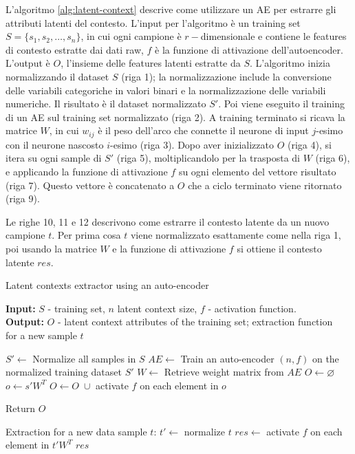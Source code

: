 \documentclass[12pt,italian]{report}
\begin{document}
L'algoritmo \autoref{alg:latent-context} descrive come utilizzare un AE per estrarre gli attributi latenti del contesto. L'input per l'algoritmo è un training set $S = \{s_1, s_2, \dots, s_n\}$, in cui ogni campione è $r-$dimensionale e contiene le features di contesto estratte dai dati raw, $f$ è la funzione di attivazione dell'autoencoder. L'output è $O$, l'insieme delle features latenti estratte da $S$. L'algoritmo inizia normalizzando il dataset $S$ (riga 1); la normalizzazione include la conversione delle variabili categoriche in valori binari e la normalizzazione delle variabili numeriche. Il risultato è il dataset normalizzato $S'$. Poi viene eseguito il training di un AE sul training set normalizzato (riga 2). A training terminato si ricava la matrice $W$, in cui $w_{ij}$ è il peso dell'arco che connette il neurone di input $j$-esimo con il neurone nascosto $i$-esimo (riga 3). Dopo aver inizializzato $O$ (riga 4), si itera su ogni sample di $S'$ (riga 5), moltiplicandolo per la trasposta di $W$ (riga 6), e applicando la funzione di attivazione $f$ su ogni elemento del vettore risultato (riga 7). Questo vettore è concatenato a $O$ che a ciclo terminato viene ritornato (riga 9).

Le righe 10, 11 e 12 descrivono come estrarre il contesto latente da un nuovo campione $t$. Per prima cosa $t$ viene normalizzato esattamente come nella riga 1, poi usando la matrice $W$ e la funzione di attivazione $f$ si ottiene il contesto latente $res$.

\begin{algorithm}
\caption{Latent contexts extractor using an auto-encoder}
\label{alg:latent-context}
 \hspace*{\algorithmicindent} \textbf{Input:} $S$ - training set, $n$ latent context size, $f$ - activation function.\\
 \hspace*{\algorithmicindent} \textbf{Output:} $O$ - latent context attributes of the training set; extraction function\\ 
 \hspace*{\algorithmicindent} for a new sample $t$
\begin{algorithmic}[1]
\STATE $S' \leftarrow$ Normalize all samples in $S$
\STATE $AE \leftarrow$ Train an auto-encoder $(n,f)$ on the normalized training dataset $S'$
\STATE $W \leftarrow$ Retrieve weight matrix from $AE$
\STATE $O \leftarrow \varnothing$
	\STATE $o \leftarrow s'W^T$
	\STATE $O \leftarrow O \; \cup$ activate $f$ on each element in $o$ 
\ENDFOR

\STATE Return $O$

Extraction for a new data sample $t$:
\STATE $t' \leftarrow$ normalize $t$
\STATE $res \leftarrow$ activate $f$ on each element in $t'W^T$ 
\RETURN $res$

\end{algorithmic}
\end{algorithm}
\end{document}
